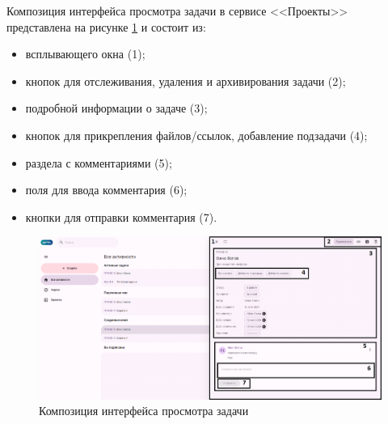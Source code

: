 Композиция интерфейса просмотра задачи в сервисе <<Проекты>> представлена на рисунке \ref{templ:image7d} и состоит из:
\begin{itemize}
  \item всплывающего окна (1);
  \item кнопок для отслеживания, удаления и архивирования задачи (2);
  \item подробной информации о задаче (3);
  \item кнопок для прикрепления файлов/ссылок, добавление подзадачи (4);
  \item раздела с комментариями (5);
  \item поля для ввода комментария (6);
  \item кнопки для отправки комментария (7).
\end{itemize}
\begin{figure}[H]
	\centering
	\includegraphics[width=1\linewidth]{images/проекты4}
	\caption{Композиция интерфейса просмотра задачи}
	\label{templ:image7d}
\end{figure}

